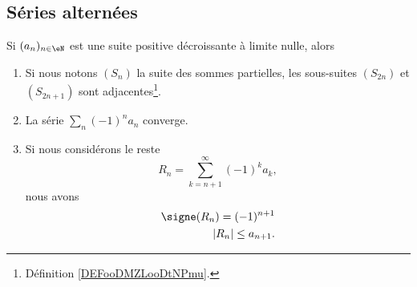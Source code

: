 \subsection{Séries alternées}

\begin{theorem}      \label{THOooOHANooHYfkII} 
    Si \( (a_n)_{n\in \eN}\) est une suite positive décroissante à limite nulle, alors
    \begin{enumerate}
        \item
            Si nous notons \( (S_n)\) la suite des sommes partielles, les sous-suites \( (S_{2n})\) et \( (S_{2n+1})\) sont adjacentes\footnote{Définition \ref{DEFooDMZLooDtNPmu}.}.
        \item
            La série \( \sum_n(-1)^na_n\) converge.
        \item       \label{ITEMooWEPWooXhLMYL}
            Si nous considérons le reste 
            \begin{equation}
                R_n=\sum_{k=n+1}^{\infty}(-1)^ka_k,
            \end{equation}
            nous avons
            \begin{subequations}
                \begin{align}
                    \signe(R_n)=(-1)^{n+1}\\
                    | R_n |\leq a_{n+1}.
                \end{align}
            \end{subequations}
    \end{enumerate}
\end{theorem}


